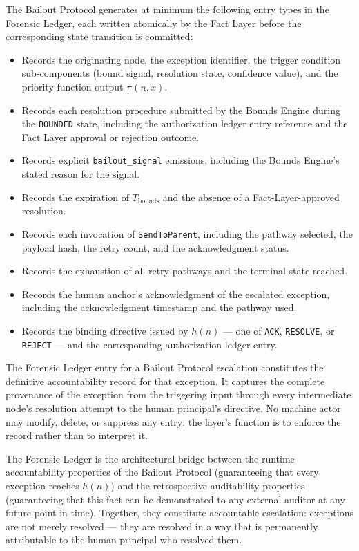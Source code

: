 The Bailout Protocol generates at minimum the following entry types in the Forensic Ledger, each written atomically by the Fact Layer before the corresponding state transition is committed:

\begin{itemize}\itemsep=0pt
\item[\texttt{bailout-trigger}] Records the originating node, the exception identifier, the trigger condition sub-components (bound signal, resolution state, confidence value), and the priority function output $\pi(n, x)$.
\item[\texttt{bounds-resolution-attempt}] Records each resolution procedure submitted by the Bounds Engine during the \texttt{BOUNDED} state, including the authorization ledger entry reference and the Fact Layer approval or rejection outcome.
\item[\texttt{bailout-signal}] Records explicit \texttt{bailout\_signal} emissions, including the Bounds Engine's stated reason for the signal.
\item[\texttt{timeout-bounds-expired}] Records the expiration of $T_{\text{bounds}}$ and the absence of a Fact-Layer-approved resolution.
\item[\texttt{escalation-sent}] Records each invocation of \texttt{SendToParent}, including the pathway selected, the payload hash, the retry count, and the acknowledgment status.
\item[\texttt{pathway-exhausted}] Records the exhaustion of all retry pathways and the terminal state reached.
\item[\texttt{human-ack}] Records the human anchor's acknowledgment of the escalated exception, including the acknowledgment timestamp and the pathway used.
\item[\texttt{human-directive}] Records the binding directive issued by $h(n)$ --- one of \texttt{ACK}, \texttt{RESOLVE}, or \texttt{REJECT} --- and the corresponding authorization ledger entry.
\end{itemize}

The Forensic Ledger entry for a Bailout Protocol escalation constitutes the definitive accountability record for that exception. It captures the complete provenance of the exception from the triggering input through every intermediate node's resolution attempt to the human principal's directive. No machine actor may modify, delete, or suppress any entry; the layer's function is to enforce the record rather than to interpret it.

The Forensic Ledger is the architectural bridge between the runtime accountability properties of the Bailout Protocol (guaranteeing that every exception reaches $h(n)$) and the retrospective auditability properties (guaranteeing that this fact can be demonstrated to any external auditor at any future point in time). Together, they constitute accountable escalation: exceptions are not merely resolved --- they are resolved in a way that is permanently attributable to the human principal who resolved them.

